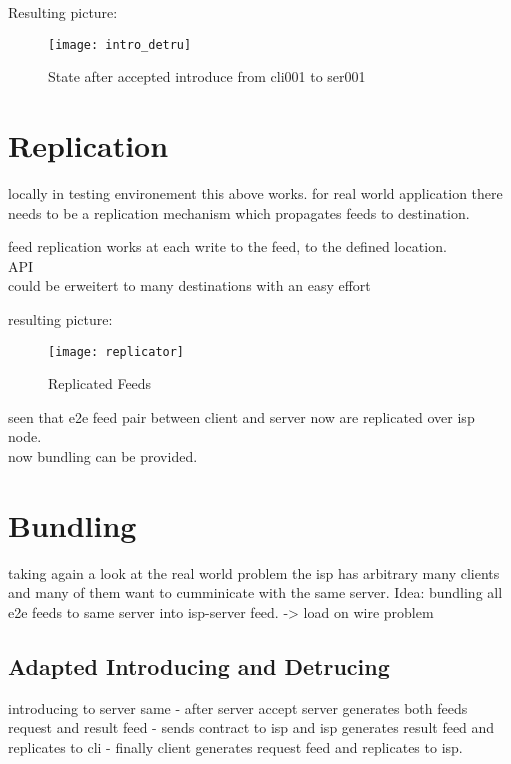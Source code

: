 Resulting picture:
\begin{figure}
    \centering
    \texttt{[image: intro\_detru]}
    \caption{State after accepted introduce from cli001 to ser001}
    \label{fig:contract_cli_isp}
\end{figure}

\pagebreak
\section{Replication}
locally in testing environement this above works. for real world application there needs to be a replication mechanism which propagates feeds to destination.

feed replication works at each write to the feed, to the  defined location.\\

API\\

could be erweitert to many destinations with an easy effort

resulting picture:
\begin{figure}
    \centering
    \texttt{[image: replicator]}
    \caption{Replicated Feeds}
    \label{fig:replication}
\end{figure}

seen that e2e feed pair between client and server now are replicated over isp node.\\ 
now bundling can be provided.

\section{Bundling}
taking again a look at the real world problem the isp has arbitrary many clients and many of them want to cumminicate with the same server. Idea: bundling all e2e feeds to same server into isp-server feed.
-> load on wire problem

\subsection{Adapted Introducing and Detrucing}
introducing to server same - after server accept server generates both feeds request and result feed - sends contract to isp and isp generates result feed and replicates to cli - finally client generates request feed and replicates to isp.


